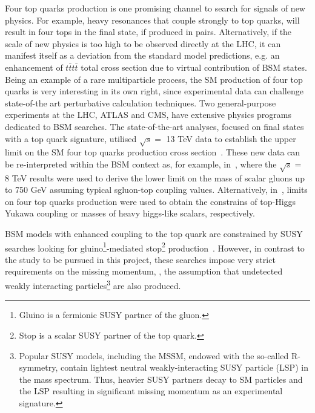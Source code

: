 \textcolor{\mynew}{
Four top quarks production is one promising channel to search for signals of new physics. For example, heavy resonances that couple strongly to top quarks, will result in four tops in the final state, if produced in pairs. Alternatively, if the scale of new physics is too high to be observed directly at the LHC, it can manifest itself as a deviation from the standard model predictions, e.g. an enhancement of $t\bar{t}t\bar{t}$ total cross section due to virtual contribution of BSM states. Being an example of a rare multiparticle process, the SM production of four top quarks is very interesting in its own right, since experimental data can challenge state-of-the art perturbative calculation techniques.
}
\textcolor{\mycolor}{
Two general-purpose experiments at the LHC, ATLAS and CMS, have extensive physics programs dedicated to BSM searches. The state-of-the-art analyses, focused on final states with a top quark signature, utilised $\sqrt{s}=$ 13 TeV data to establish the upper limit on the SM four top quarks production cross section~\cite{Aaboud:2017faq,Sirunyan:2017roi,Sirunyan:2017tep}. These new data can be re-interpreted within the BSM context as, for example, in~\cite{Beck:2015cga}, where %
the $\sqrt{s}=$ 8 TeV results were used to derive the lower limit on the mass of scalar gluons up to 750 GeV assuming typical sgluon-top coupling values. Alternatively, in~\cite{Cao:2016wib,Sirunyan:2017tep}, limits on four top quarks production were used to obtain the constrains of top-Higgs Yukawa coupling or masses of heavy higgs-like scalars, respectively.}

\textcolor{\mycolor}{
BSM models with enhanced coupling to the top quark are constrained by SUSY searches looking for gluino\footnote{Gluino is a fermionic SUSY partner of the gluon.}-mediated stop\footnote{Stop is a scalar SUSY partner of the top quark.} production~\cite{Sirunyan:2017uyt}. However, in contrast to the study to be pursued in this project, these searches impose very strict requirements on the missing momentum, \misspt, the assumption that undetected weakly interacting particles\footnote{Popular SUSY models, including the MSSM, endowed with the so-called R-symmetry, contain lightest neutral weakly-interacting SUSY particle (LSP) in the mass spectrum. Thus, heavier SUSY partners decay to SM particles and the LSP resulting in significant missing momentum as an experimental signature.} are also produced.}

